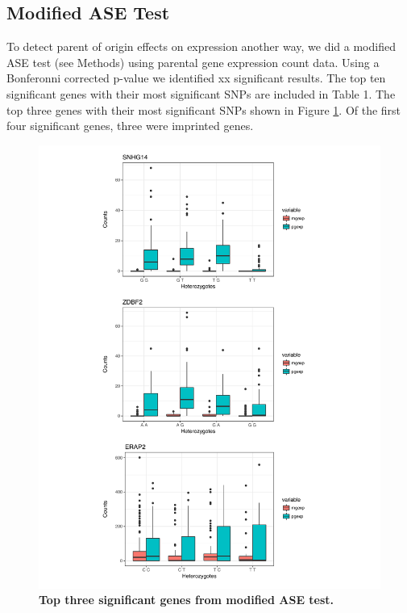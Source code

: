 \subsection{Modified ASE Test}\label{Modified ASE Test} 

To detect parent of origin effects on expression another way, we did a modified ASE test (see Methods) using parental gene expression count data. Using a Bonferonni corrected p-value we identified xx significant results. The top ten significant genes with their most significant SNPs are included in Table 1. The top three genes with their most significant SNPs shown in Figure \ref{fig:top3}. Of the first four significant genes, three were imprinted genes.


\begin{figure}[!htb]
\centering \includegraphics[width=5in]{img/ch04/fig-07-top3.pdf}
\caption[Top three significant genes from modified ASE test.]{\textbf{Top three significant genes from modified ASE test.} }
\label{fig:top3}
\end{figure}


